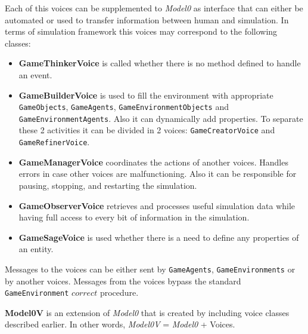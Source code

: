 Each of this voices can be supplemented to \textit{Model0} as interface that can either be automated or used to transfer information between human and simulation. In terms of simulation framework this voices may correspond to the following classes:
\begin{itemize}
\item \textbf{GameThinkerVoice} is called whether there is no method defined to handle an event.
\item \textbf{GameBuilderVoice} is used to fill the environment with appropriate \texttt{GameObjects}, \texttt{GameAgents}, \texttt{GameEnvironmentObjects} and \break \texttt{GameEnvironmentAgents}. Also it can dynamically add properties. To separate these 2 activities it can be divided in 2 voices: \texttt{GameCreatorVoice} and \texttt{GameRefinerVoice}.
\item \textbf{GameManagerVoice} coordinates the actions of another voices. Handles errors in case other voices are malfunctioning. Also it can be responsible for pausing, stopping, and restarting the simulation.
\item \textbf{GameObserverVoice} retrieves and processes useful simulation data while having full access to every bit of information in the simulation.
\item \textbf{GameSageVoice} is used whether there is a need to define any properties of an entity.
\end{itemize}
Messages to the voices can be either sent by \texttt{GameAgents}, \texttt{GameEnvironments} or by another voices. Messages from the voices bypass the standard \texttt{GameEnvironment} $correct$ procedure.
\begin{definition}
\textbf{Model0V} is an extension of \textit{Model0} that is created by including voice classes described earlier. In other words,
\textit{Model0V} = \textit{Model0}  + Voices.
\end{definition}

